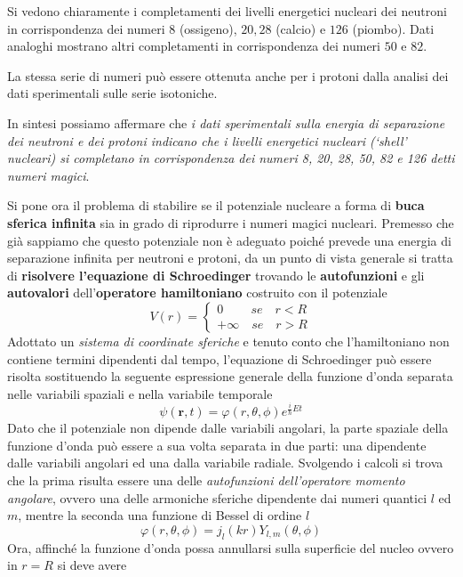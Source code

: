 Si vedono chiaramente i completamenti dei livelli energetici nucleari dei neutroni in corrispondenza dei numeri $8$
(ossigeno), $20, 28$ (calcio) e $126$ (piombo).
Dati analoghi mostrano altri completamenti in corrispondenza dei numeri $50$ e $82$.

La stessa serie di numeri può essere ottenuta anche per i protoni dalla analisi dei dati sperimentali sulle serie isotoniche.

In sintesi possiamo affermare che
\emph{i dati sperimentali sulla energia di separazione dei neutroni e dei protoni indicano che i  livelli energetici nucleari (‘shell’ nucleari)
	si completano in corrispondenza dei numeri 8, 20, 28, 50, 82 e 126 detti numeri magici}.
\bigskip

Si pone ora il problema di stabilire se il potenziale nucleare a forma di \textbf{buca sferica infinita} sia in grado di riprodurre i numeri magici nucleari. Premesso che già sappiamo che questo potenziale non è adeguato poiché prevede una energia di separazione infinita per neutroni e protoni, da un punto di vista generale si tratta di \textbf{risolvere l’equazione di Schroedinger} trovando le \textbf{autofunzioni} e gli \textbf{autovalori} dell’\textbf{operatore hamiltoniano} costruito con il potenziale
\[
V(r) =
\begin{cases}
	0 \qquad \ se \quad r <R \\
	+ \infty \quad se \quad r > R
\end{cases}
\]
Adottato un \emph{sistema di coordinate sferiche} e tenuto conto che l’hamiltoniano non contiene termini dipendenti dal tempo, l’equazione di Schroedinger può essere risolta sostituendo la seguente espressione generale della funzione d’onda separata nelle variabili spaziali e nella variabile temporale
\[
\psi(\bm{r},t) = \varphi(r, \theta, \phi) e^{ \frac{i}{\hslash} Et}
\]
Dato che il potenziale non dipende dalle variabili angolari, la parte spaziale della funzione d’onda può essere a sua volta separata in due parti: una dipendente dalle variabili angolari ed una dalla variabile radiale. Svolgendo i calcoli si trova che la prima risulta essere una delle \emph{autofunzioni dell’operatore momento angolare}, ovvero una delle armoniche sferiche dipendente dai numeri quantici $l$ ed $m$, mentre la seconda una funzione di Bessel di ordine $l$
\begin{equation}
	\varphi (r, \theta, \phi) = j_{l} (kr) Y_{l,m}(\theta,\phi)
	\label{eq:spatial-part-wave-function}
\end{equation}
Ora, affinché la funzione d’onda possa annullarsi sulla superficie del nucleo ovvero in $r=R$ si deve avere
